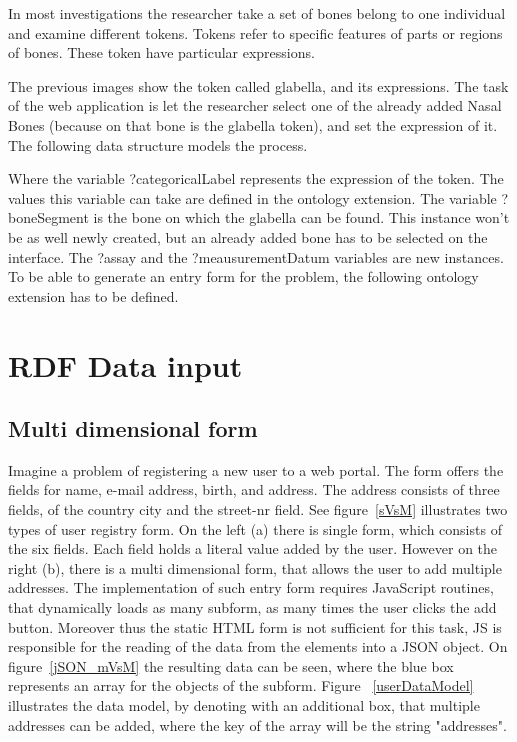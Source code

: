 In most investigations the researcher take a set of bones belong to one individual and examine different tokens. Tokens refer to specific features of parts or regions of bones. These token have particular expressions.


The previous images show the token called glabella, and its expressions. The task of the web application is let the researcher select one of the already added Nasal Bones (because on that bone is the glabella token), and set the expression of it. The following data structure models the process.


Where the variable ?categoricalLabel represents the expression of the token. The values this variable can take are defined in the ontology extension. The variable ?boneSegment is the bone on which the glabella can be found. This instance won’t be as well newly created, but an already added bone has to be selected on the interface. The ?assay and the ?meausurementDatum variables are new instances.  To be able to generate an entry form for the problem, the following ontology extension has to be defined.



\section{RDF Data input}

\subsection{Multi dimensional form}

Imagine a problem of registering a new user to a web portal. The form offers the fields for name, e-mail address, birth, and address. The address consists of three fields, of the country city and the street-nr field. See figure~\ref{sVsM} illustrates two types of user registry form. On the left (a) there is single form, which consists of the six fields. Each field holds a literal value added by the user. However on the right (b), there is a multi dimensional form, that allows the user to add multiple addresses. The implementation of such entry form requires JavaScript routines, that dynamically loads as many subform, as many times the user clicks the add button. Moreover thus the static HTML form is not sufficient for this task, JS is responsible for the reading of the data from the elements into a JSON object. On figure~\ref{jSON_mVsM} the resulting data can be seen, where the blue box represents an array for the objects of the subform.
Figure ~\ref{userDataModel} illustrates the data model, by denoting with an additional box, that multiple addresses can be added, where the key of the array will be the string "addresses".

